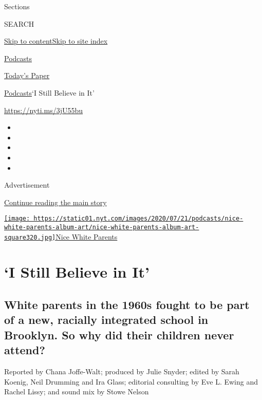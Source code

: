 Sections

SEARCH

\protect\hyperlink{site-content}{Skip to
content}\protect\hyperlink{site-index}{Skip to site index}

\href{https://www.nytimes.com/spotlight/podcasts}{Podcasts}

\href{https://myaccount.nytimes.com/auth/login?response_type=cookie\&client_id=vi}{}

\href{https://www.nytimes.com/section/todayspaper}{Today's Paper}

\href{/spotlight/podcasts}{Podcasts}\textbar{}`I Still Believe in It'

\url{https://nyti.ms/3jU55bu}

\begin{itemize}
\item
\item
\item
\item
\item
\end{itemize}

Advertisement

\protect\hyperlink{after-top}{Continue reading the main story}

\href{https://www.nytimes.com/column/nice-white-parents}{\texttt{[image: https://static01.nyt.com/images/2020/07/21/podcasts/nice-white-parents-album-art/nice-white-parents-album-art-square320.jpg]}Nice
White Parents}

\hypertarget{i-still-believe-in-it}{%
\section{`I Still Believe in It'}\label{i-still-believe-in-it}}

\hypertarget{white-parents-in-the-1960s-fought-to-be-part-of-a-new-racially-integrated-school-in-brooklyn-so-why-did-their-children-never-attend}{%
\subsection{White parents in the 1960s fought to be part of a new,
racially integrated school in Brooklyn. So why did their children never
attend?}\label{white-parents-in-the-1960s-fought-to-be-part-of-a-new-racially-integrated-school-in-brooklyn-so-why-did-their-children-never-attend}}

Reported by Chana Joffe-Walt; produced by Julie Snyder; edited by Sarah
Koenig, Neil Drumming and Ira Glass; editorial consulting by Eve L.
Ewing and Rachel Lissy; and sound mix by Stowe Nelson

